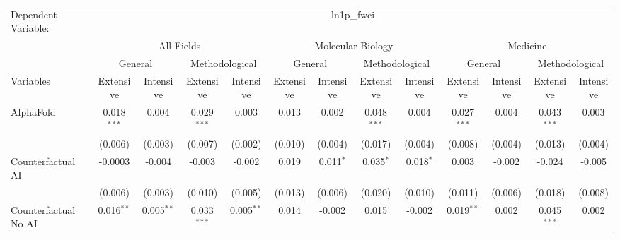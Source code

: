\begingroup
\centering
\begin{tabular}{lcccccccccccc}
   \tabularnewline \midrule \midrule
   Dependent Variable: & \multicolumn{12}{c}{ln1p\_fwci}\\
 & \multicolumn{4}{c}{All Fields} & \multicolumn{4}{c}{Molecular Biology} & \multicolumn{4}{c}{Medicine} \\
\cmidrule(lr){2-5} \cmidrule(lr){6-9} \cmidrule(lr){10-13}
 & \multicolumn{2}{c}{General} & \multicolumn{2}{c}{Methodological} & \multicolumn{2}{c}{General} & \multicolumn{2}{c}{Methodological} & \multicolumn{2}{c}{General} & \multicolumn{2}{c}{Methodological} \\
\cmidrule(lr){2-3} \cmidrule(lr){4-5} \cmidrule(lr){6-7} \cmidrule(lr){8-9} \cmidrule(lr){10-11} \cmidrule(lr){12-13}
Variables & \multicolumn{1}{c}{Extensive} & \multicolumn{1}{c}{Intensive} & \multicolumn{1}{c}{Extensive} & \multicolumn{1}{c}{Intensive} & \multicolumn{1}{c}{Extensive} & \multicolumn{1}{c}{Intensive} & \multicolumn{1}{c}{Extensive} & \multicolumn{1}{c}{Intensive} & \multicolumn{1}{c}{Extensive} & \multicolumn{1}{c}{Intensive} & \multicolumn{1}{c}{Extensive} & \multicolumn{1}{c}{Intensive} \\
\cmidrule(lr){1-1}\cmidrule(lr){2-2} \cmidrule(lr){3-3} \cmidrule(lr){4-4} \cmidrule(lr){5-5} \cmidrule(lr){6-6} \cmidrule(lr){7-7} \cmidrule(lr){8-8} \cmidrule(lr){9-9} \cmidrule(lr){10-10} \cmidrule(lr){11-11} \cmidrule(lr){12-12} \cmidrule(lr){13-13}
   AlphaFold                                & 0.018$^{***}$ & 0.004        & 0.029$^{***}$ & 0.003        & 0.013   & 0.002       & 0.048$^{***}$ & 0.004       & 0.027$^{***}$ & 0.004    & 0.043$^{***}$ & 0.003\\   
                                            & (0.006)       & (0.003)      & (0.007)       & (0.002)      & (0.010) & (0.004)     & (0.017)       & (0.004)     & (0.008)       & (0.004)  & (0.013)       & (0.004)\\   
   Counterfactual AI                        & -0.0003       & -0.004       & -0.003        & -0.002       & 0.019   & 0.011$^{*}$ & 0.035$^{*}$   & 0.018$^{*}$ & 0.003         & -0.002   & -0.024        & -0.005\\   
                                            & (0.006)       & (0.003)      & (0.010)       & (0.005)      & (0.013) & (0.006)     & (0.020)       & (0.010)     & (0.011)       & (0.006)  & (0.018)       & (0.008)\\   
   Counterfactual No AI                     & 0.016$^{**}$  & 0.005$^{**}$ & 0.033$^{***}$ & 0.005$^{**}$ & 0.014   & -0.002      & 0.015         & -0.002      & 0.019$^{**}$  & 0.002    & 0.045$^{***}$ & 0.002\\   

\end{tabular}
